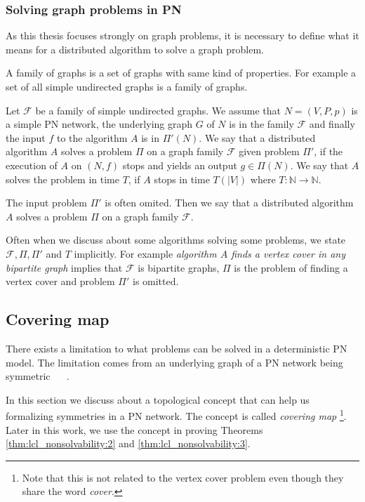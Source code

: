 
\subsubsection{Solving graph problems in PN}
As this thesis focuses strongly on graph problems, it is necessary to define what it means for a distributed algorithm to solve a graph problem.

A family of graphs is a set of graphs with same kind of properties.
For example a set of all simple undirected graphs is a family of graphs.

Let $\mathcal{F}$ be a family of simple undirected graphs.
We assume that $N=(V, P, p)$ is a simple PN network, the underlying graph $G$ of $N$ is in the family $\mathcal{F}$ and finally the input $f$ to the algorithm $A$ is in $\Pi'(N)$.
We say that a distributed algorithm $A$ solves a problem $\Pi$ on a graph family $\mathcal{F}$ given problem $\Pi'$, if the execution of $A$ on $(N, f)$ stops and yields an output $g \in \Pi(N)$.
We say that $A$ solves the problem in time $T$, if $A$ stops in time $T(|V|)$ where $T\colon \mathbb{N} \rightarrow \mathbb{N}$.

The input problem $\Pi'$ is often omited.
Then we say that a distributed algorithm $A$ solves a problem $\Pi$ on a graph family $\mathcal{F}$.

Often when we discuss about some algorithms solving some problems, we state $\mathcal{F}, \Pi, \Pi'$ and $T$ implicitly.
For example \emph{algorithm $A$ finds a vertex cover in any bipartite graph} implies that $\mathcal{F}$ is bipartite graphs, $\Pi$ is the problem of finding a vertex cover and problem $\Pi'$ is omitted.



\subsection{Covering map} \label{sec:covering_map}
There exists a limitation to what problems can be solved in a deterministic PN model.
The limitation comes from an underlying graph of a PN network being symmetric~%
\cite{DBLP:conf/focs/Linial87}~%
\cite{DBLP:journals/siamcomp/Linial92}.

In this section we discuss about a topological concept that can help us formalizing symmetries in a PN network.
The concept is called \emph{covering map}
\footnote{Note that this is not related to the vertex cover problem even though they share the word \emph{cover}.}.
Later in this work, we use the concept in proving Theorems \ref{thm:lcl_nonsolvability:2} and \ref{thm:lcl_nonsolvability:3}.

